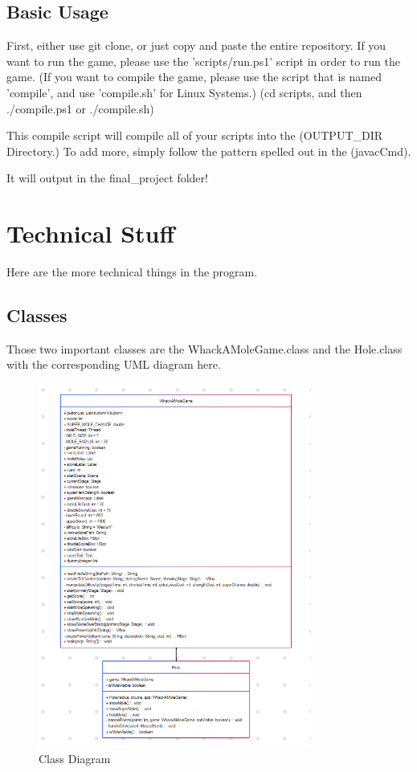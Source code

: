 \documentclass[mdthm]{scrartcl}
\begin{document}
\subsection{Basic Usage}

First, either use git clone, or just copy and paste the entire repository. 
If you want to run the game, please use the 'scripts/run.ps1' script in order to run the game. (If you want to compile the game, please use the script that is named 'compile', and use 'compile.sh' for Linux Systems.)   (cd scripts, and then ./compile.ps1 or ./compile.sh)

This compile script will compile all of your scripts into the (OUTPUT\_DIR Directory.) To add more, simply follow the pattern spelled out in the (javacCmd). 

It will output in the final\_project folder! 
\pagebreak


\section{Technical Stuff}

Here are the more technical things in the program. 

\subsection{Classes}

Those two important classes are the WhackAMoleGame.class and the Hole.class with the corresponding UML diagram here. 

\begin{figure}[h]  %
    \centering
    \includegraphics[width=0.8\textwidth]{../images/umlclassdiagram.png}
    \caption{Class Diagram}
    \label{fig:myimage}
\end{figure}
\end{document}
